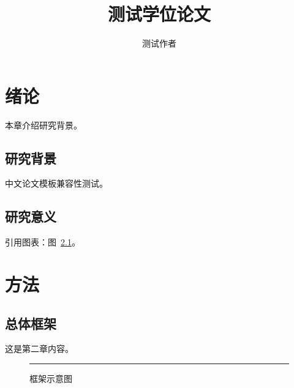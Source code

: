 \documentclass[UTF8,12pt,openany]{ctexbook}
\begin{document}
\title{测试学位论文}
\author{测试作者}
\maketitle

\chapter{绪论}\label{ch:intro}

本章介绍研究背景。\cite{smith2025}

\section{研究背景}\label{sec:background}

中文论文模板兼容性测试。

\section{研究意义}\label{sec:meaning}

引用图表：图~\ref{fig:frame}。

\chapter{方法}\label{ch:method}

\section{总体框架}

这是第二章内容。

\begin{figure}[h]
  \centering
  \rule{1cm}{1cm}
  \caption{框架示意图}\label{fig:frame}
\end{figure}
\end{document}
